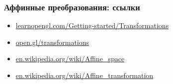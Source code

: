 \documentclass{beamer}
\begin{document}
\begin{frame}
\frametitle{Аффинные преобразования: ссылки}
\begin{itemize}
\item \href{https://learnopengl.com/Getting-started/Transformations}{learnopengl.com/Getting-started/Transformations}
\item \href{https://open.gl/transformations}{open.gl/transformations}
\item \href{https://en.wikipedia.org/wiki/Affine_space}{en.wikipedia.org/wiki/Affine\_space}
\item \href{https://en.wikipedia.org/wiki/Affine_transformation}{en.wikipedia.org/wiki/Affine\_transformation}
\end{itemize}
\end{frame}
\end{document}
